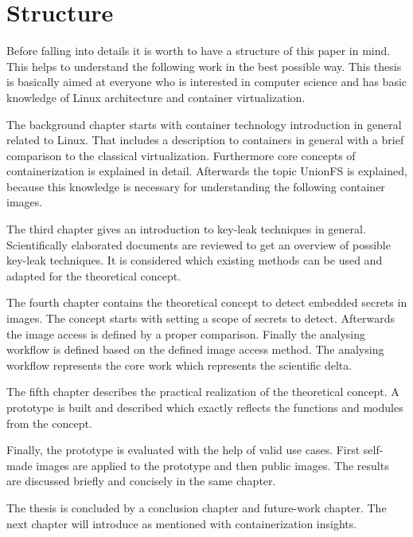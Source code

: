 %
%
\section{Structure}
\label{sec:intro:structure}
Before falling into details it is worth to have a structure of this paper in mind. This helps to understand the following work in the best possible way. This thesis is basically aimed at everyone who is interested in computer science and has basic knowledge of Linux architecture and container virtualization.

The background chapter starts with container technology introduction in general related to Linux. 
That includes a description to containers in general with a brief comparison to the classical virtualization. Furthermore core concepts of containerization is explained in detail.
Afterwards the topic UnionFS is explained, because this knowledge is necessary for understanding the following container images.

The third chapter gives an introduction to key-leak techniques in general.
Scientifically elaborated documents are reviewed to get an overview of possible key-leak techniques.
It is considered which existing methods can be used and adapted for the theoretical concept.

The fourth chapter contains the theoretical concept to detect embedded secrets in images. The concept starts with setting a scope of secrets to detect. Afterwards the image access is defined by a proper comparison.
Finally the analysing workflow is defined based on the defined image access method.
The analysing workflow represents the core work which represents the scientific delta.

The fifth chapter describes the practical realization of the theoretical concept. A prototype is built and described which exactly reflects the functions and modules from the concept. 

Finally, the prototype is evaluated with the help of valid use cases. First self-made images are applied to the prototype and then public images. The results are discussed briefly and concisely in the same chapter.

The thesis is concluded by a conclusion chapter and future-work chapter.	
The next chapter will introduce as mentioned with containerization insights.
